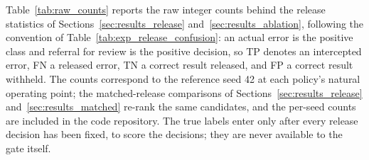 \documentclass[preprint,12pt,authoryear]{elsarticle}
\begin{document}
Table~\ref{tab:raw_counts} reports the raw integer counts behind the release statistics of Sections~\ref{sec:results_release} and~\ref{sec:results_ablation}, following the convention of Table~\ref{tab:exp_release_confusion}: an actual error is the positive class and referral for review is the positive decision, so TP denotes an intercepted error, FN a released error, TN a correct result released, and FP a correct result withheld.
The counts correspond to the reference seed 42 at each policy's natural operating point; the matched-release comparisons of Sections~\ref{sec:results_release} and~\ref{sec:results_matched} re-rank the same candidates, and the per-seed counts are included in the code repository.
The true labels enter only after every release decision has been fixed, to score the decisions; they are never available to the gate itself.
\end{document}
